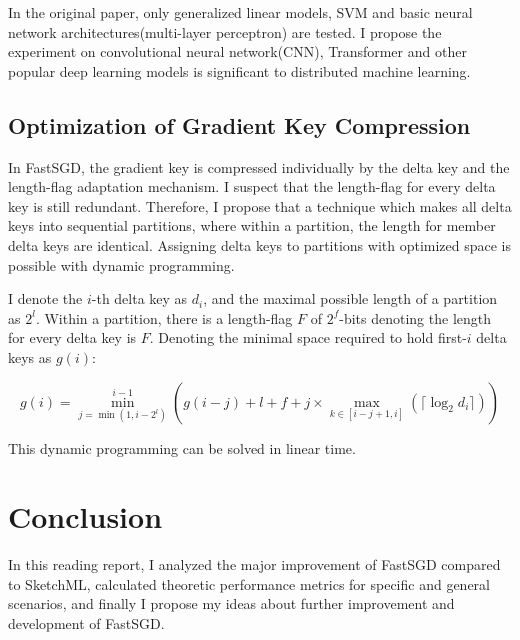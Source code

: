 \documentclass[journal]{IEEEtran}
\begin{document}
In the original paper\cite{https://doi.org/10.48550/arxiv.2112.04291}, only generalized linear models, SVM and basic neural network architectures(multi-layer perceptron) are tested. I propose the experiment on convolutional neural network(CNN), Transformer and other popular deep learning models is significant to distributed machine learning.

\subsection{Optimization of Gradient Key Compression}

In FastSGD, the gradient key is compressed individually by the delta key and the length-flag adaptation mechanism. I suspect that the length-flag for every delta key is still redundant. Therefore, I propose that a technique which makes all delta keys into sequential partitions, where within a partition, the length for member delta keys are identical. Assigning delta keys to partitions with optimized space is possible with dynamic programming.

I denote the $i$-th delta key as $d_i$, and the maximal possible length of a partition as $2^l$. Within a partition, there is a length-flag $F$ of $2^f$-bits denoting the length for every delta key is $F$. Denoting the minimal space required to hold first-$i$ delta keys as $g(i)$:

$$
g(i) = \min_{j = \min(1, i - 2^l)}^{i - 1} (g(i - j) + l + f + j \times \max_{k \in [i - j + 1, i]} (\lceil \log_2 d_i \rceil))
$$

This dynamic programming can be solved in linear time.

\section{Conclusion}

In this reading report, I analyzed the major improvement of FastSGD compared to SketchML, calculated theoretic performance metrics for specific and general scenarios, and finally I propose my ideas about further improvement and development of FastSGD.



\end{document}
